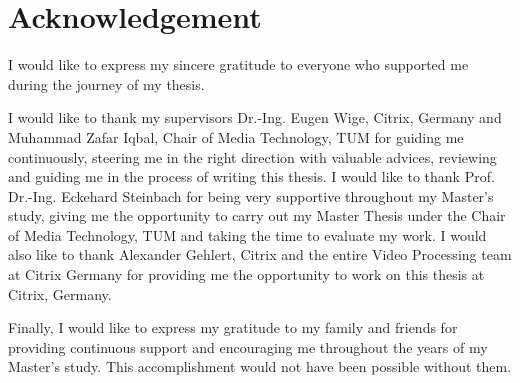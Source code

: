 
\thispagestyle{plain}

\section*{Acknowledgement}

I would like to express my sincere gratitude to everyone who supported me during the journey of my thesis.

I would like to thank my supervisors Dr.-Ing. Eugen Wige, Citrix, Germany and Muhammad Zafar Iqbal, Chair of Media Technology, TUM for guiding me continuously, steering me in the right direction with valuable advices, reviewing and guiding me in the process of writing this thesis. I would like to thank Prof. Dr.-Ing. Eckehard Steinbach for being very supportive throughout my Master's study, giving me the opportunity to carry out my Master Thesis under the Chair of Media Technology, TUM and taking the time to evaluate my work. I would also like to thank Alexander Gehlert, Citrix and the entire Video Processing team at Citrix Germany for providing me the opportunity to work on this thesis at Citrix, Germany.

Finally, I would like to express my gratitude to my family and friends for providing continuous support and encouraging me throughout the years of my Master's study. This accomplishment would not have been possible without them.